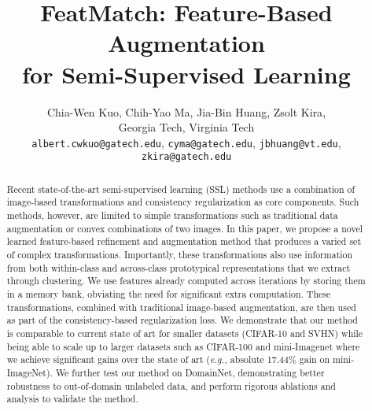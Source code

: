 \documentclass[runningheads]{llncs}
\begin{document}
\pagestyle{headings}
\mainmatter
\def\ECCVSubNumber{3009}

\title{FeatMatch: Feature-Based Augmentation \\ for Semi-Supervised Learning}



\author{Chia-Wen Kuo\textsuperscript{}, Chih-Yao Ma\textsuperscript{}, Jia-Bin Huang\textsuperscript{}, Zsolt Kira\textsuperscript{}, \\
\normalsize
\textsuperscript{}Georgia Tech,
\textsuperscript{}Virginia Tech\\
\vskip 0.1in
\scriptsize
\texttt{albert.cwkuo@gatech.edu},
\texttt{cyma@gatech.edu},
\texttt{jbhuang@vt.edu},
\texttt{zkira@gatech.edu}
}

 \maketitle

\begin{abstract}
Recent state-of-the-art semi-supervised learning (SSL) methods use a combination of image-based transformations and consistency regularization as core components. Such methods, however, are limited to simple transformations such as traditional data augmentation or convex combinations of two images. In this paper, we propose a novel learned feature-based refinement and augmentation method that produces a varied set of complex transformations. Importantly, these transformations also use information from both within-class and across-class prototypical representations that we extract through clustering. We use features already computed across iterations by storing them in a memory bank, obviating the need for significant extra computation. These transformations, combined with traditional image-based augmentation, are then used as part of the consistency-based regularization loss. We demonstrate that our method is comparable to current state of art for smaller datasets (CIFAR-10 and SVHN) while being able to scale up to larger datasets such as CIFAR-100 and mini-Imagenet where we achieve significant gains over the state of art (\textit{e.g.,} absolute 17.44\% gain on mini-ImageNet). We further test our method on DomainNet, demonstrating better robustness to out-of-domain unlabeled data, and perform rigorous ablations and analysis to validate the method.

\end{abstract}
\end{document}

